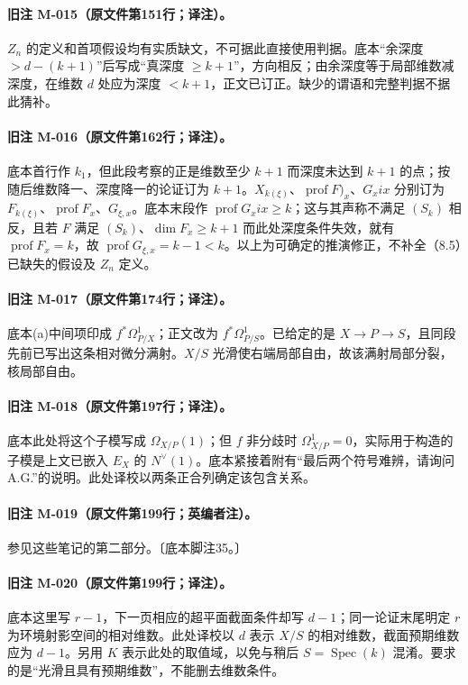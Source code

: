 \documentclass[UTF8,a4paper]{ctexbook}
\DeclareMathOperator{\Spec}{Spec}
\DeclareMathOperator{\prof}{prof}
\begin{document}
\paragraph{旧注 M-015（原文件第151行；译注）。}
$Z_n$ 的定义和首项假设均有实质缺文，不可据此直接使用判据。底本“余深度 $>d-(k+1)$”后写成“真深度 $\geq k+1$”，方向相反；由余深度等于局部维数减深度，在维数 $d$ 处应为深度 $<k+1$，正文已订正。缺少的谓语和完整判据不据此猜补。

\paragraph{旧注 M-016（原文件第162行；译注）。}
底本首行作 $k_1$，但此段考察的正是维数至少 $k+1$ 而深度未达到 $k+1$ 的点；按随后维数降一、深度降一的论证订为 $k+1$。$X_{k(\xi)}$、$\prof F)_x$、$G_xix$ 分别订为 $F_{k(\xi)}$、$\prof F_x$、$G_{\xi,x}$。底本末段作 $\prof G_xix\geq k$；这与其声称不满足 $(S_k)$ 相反，且若 $F$ 满足 $(S_k)$、$\dim F_x\geq k+1$ 而此处深度条件失效，就有 $\prof F_x=k$，故 $\prof G_{\xi,x}=k-1<k$。以上为可确定的推演修正，不补全（8.5）已缺失的假设及 $Z_n$ 定义。

\paragraph{旧注 M-017（原文件第174行；译注）。}
底本(a)中间项印成 $f^*\Omega^1_{P/X}$；正文改为 $f^*\Omega^1_{P/S}$。已给定的是 $X\to P\to S$，且同段先前已写出这条相对微分满射。$X/S$ 光滑使右端局部自由，故该满射局部分裂，核局部自由。

\paragraph{旧注 M-018（原文件第197行；译注）。}
底本此处将这个子模写成 $\Omega_{X/P}(1)$；但 $f$ 非分歧时 $\Omega^1_{X/P}=0$，实际用于构造的子模是上文已嵌入 $E_X$ 的 $N^\vee(1)$。底本紧接着附有“最后两个符号难辨，请询问 A.G.”的说明。此处译校以两条正合列确定该包含关系。

\paragraph{旧注 M-019（原文件第199行；英编者注）。}
参见这些笔记的第二部分。〔底本脚注35。〕

\paragraph{旧注 M-020（原文件第199行；译注）。}
底本这里写 $r-1$，下一页相应的超平面截面条件却写 $d-1$；同一论证末尾明定 $r$ 为环境射影空间的相对维数。此处译校以 $d$ 表示 $X/S$ 的相对维数，截面预期维数应为 $d-1$。另用 $K$ 表示此处的取值域，以免与稍后 $S=\Spec(k)$ 混淆。要求的是“光滑且具有预期维数”，不能删去维数条件。
\end{document}
